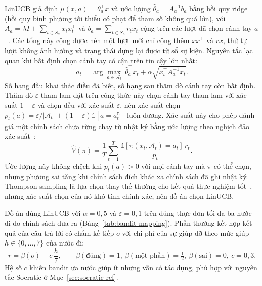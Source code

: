 LinUCB giả định $\mu(x,a)=\theta_a^{\top}x$ và ước lượng $\hat\theta_a=A_a^{-1}b_a$ bằng hồi quy ridge (hồi quy bình phương tối thiểu có phạt để tham số không quá lớn), với $A_a=\lambda I+\sum_{t\in S_a}x_tx_t^{\top}$ và $b_a=\sum_{t\in S_a}r_tx_t$ cộng trên các lượt đã chọn cánh tay $a$~\cite{abbasi2011}. Các tổng này cộng được nên một lượt mới chỉ cộng thêm $xx^{\top}$ và $rx$, thứ tự lượt không ảnh hưởng và trạng thái dựng lại được từ sổ sự kiện. Nguyên tắc lạc quan khi bất định chọn cánh tay có cận trên tin cậy lớn nhất:
\begin{equation}
a_t=\arg\max_{a\in\mathcal{A}_t}\ \hat\theta_a^{\top}x_t+\alpha\sqrt{x_t^{\top}A_a^{-1}x_t}.
\label{eq:linucb}
\end{equation}
Số hạng đầu khai thác điều đã biết, số hạng sau thăm dò cánh tay còn bất định. Thăm dò $\varepsilon$-tham lam đặt trên công thức này chọn cánh tay tham lam với xác suất $1-\varepsilon$ và chọn đều với xác suất $\varepsilon$, nên xác suất chọn $p_t(a)=\varepsilon/|\mathcal{A}_t|+(1-\varepsilon)\mathbb{1}[a=a^{\mathrm g}_t]$ luôn dương. Xác suất này cho phép đánh giá một chính sách chưa từng chạy từ nhật ký bằng ước lượng theo nghịch đảo xác suất~\cite{horvitz1952,li2011replay}:
\begin{equation}
\hat V(\pi)=\frac{1}{T}\sum_{t=1}^{T}\frac{\mathbb{1}[\pi(x_t,\mathcal{A}_t)=a_t]\,r_t}{p_t}.
\label{eq:ips}
\end{equation}
Ước lượng này không chệch khi $p_t(a)>0$ với mọi cánh tay mà $\pi$ có thể chọn, nhưng phương sai tăng khi chính sách đích khác xa chính sách đã ghi nhật ký. Thompson sampling là lựa chọn thay thế thường cho kết quả thực nghiệm tốt~\cite{thompson1933,chapelle2011}, nhưng xác suất chọn của nó khó tính chính xác, nên đồ án chọn LinUCB.

Đồ án dùng LinUCB với $\alpha=0{,}5$ và $\varepsilon=0{,}1$ trên đúng thực đơn tối đa ba nước đi do chính sách đưa ra (Bảng~\ref{tab:bandit-mapping}). Phần thưởng kết hợp kết quả của câu trả lời có chấm kế tiếp $o$ với chi phí của sự giúp đỡ theo mức giúp $h\in\{0,\dots,7\}$ của nước đi:
\begin{equation}
r=\beta(o)-c\,\frac{h}{7},\qquad \beta(\text{đúng})=1,\ \beta(\text{một phần})=\tfrac12,\ \beta(\text{sai})=0,\ c=0{,}3.
\label{eq:reward}
\end{equation}
Hệ số $c$ khiến bandit ưa nước giúp ít nhưng vẫn có tác dụng, phù hợp với nguyên tắc Socratic ở Mục~\ref{sec:socratic-ref}.

